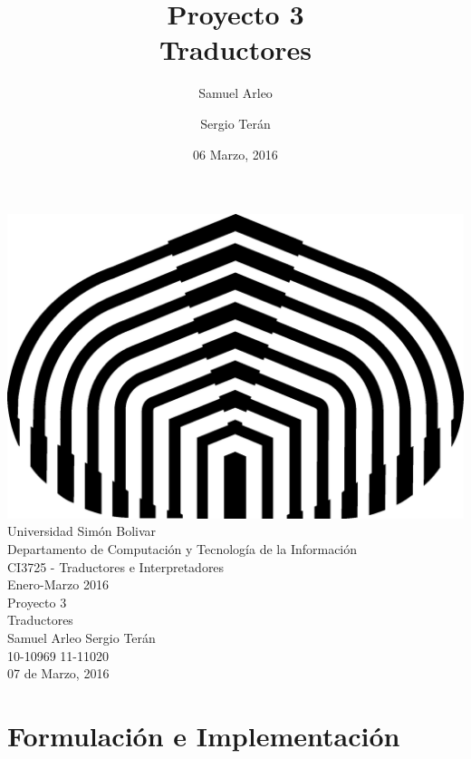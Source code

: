 \documentclass{article}
\title{Proyecto 3\\Traductores}
\author{Samuel Arleo\and Sergio Ter\'an }
\date{06 Marzo, 2016}
\begin{document}
		\begin{center}
		 	\pagestyle{headings} \small
		 	\includegraphics[scale=0.4]{USB.png}\\[0.3cm]
			Universidad Sim\'on Bolivar\\[0.1cm]
		 	Departamento de Computaci\'on y Tecnolog\'ia de la Informaci\'on\\[0.1cm]
		 	CI3725 - Traductores e Interpretadores\\[0.1cm]
		 	Enero-Marzo 2016\\[0.1cm]

			\vspace{15em}
			\LARGE Proyecto 3\\
			\vspace{0.5em}
			\Large Traductores\\
			\vspace{0.5em}
			\large Samuel Arleo \-\hspace{5em}Sergio Ter\'an\\
			\vspace{0.5em}
			\large 10-10969 \-\hspace{7em}11-11020\\
			\vspace{15em}
			07 de Marzo, 2016
		\end{center}

		\newpage
		\section{Formulaci\'on e Implementaci\'on} 

		\newpage
\end{document}
